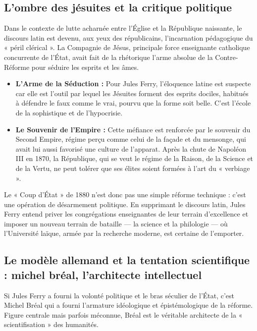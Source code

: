 \subsection{L'ombre des jésuites et la critique politique}

Dans le contexte de lutte acharnée entre l'Église et la République naissante, le discours latin est
devenu, aux yeux des républicains, l'incarnation pédagogique du « péril clérical ». La Compagnie de
Jésus, principale force enseignante catholique concurrente de l'État, avait fait de la rhétorique
l'arme absolue de la Contre-Réforme pour séduire les esprits et les âmes.

\begin{itemize}\item \textbf{L'Arme de la Séduction :} Pour Jules Ferry, l'éloquence latine est suspecte car elle est l'outil par lequel les Jésuites forment des esprits dociles, habitués à défendre le faux comme le vrai, pourvu que la forme soit belle. C'est l'école de la sophistique et de l'hypocrisie.\cite{I-1-2-ref2}\item \textbf{Le Souvenir de l'Empire :} Cette méfiance est renforcée par le souvenir du Second Empire, régime perçu comme celui de la façade et du mensonge, qui avait lui aussi favorisé une culture de l'apparat. Après la chute de Napoléon III en 1870, la République, qui se veut le régime de la Raison, de la Science et de la Vertu, ne peut tolérer que ses élites soient formées à l'art du « verbiage ».\cite{I-1-2-ref11}\end{itemize}Le « Coup d'État » de 1880 n'est donc pas une simple réforme technique : c'est une opération de
désarmement politique. En supprimant le discours latin, Jules Ferry entend priver les congrégations
enseignantes de leur terrain d'excellence et imposer un nouveau terrain de bataille — la science et
la philologie — où l'Université laïque, armée par la recherche moderne, est certaine de
l'emporter.\cite{I-1-2-ref12}



\subsection{Le modèle allemand et la tentation scientifique : michel bréal, l'architecte intellectuel}

Si Jules Ferry a fourni la volonté politique et le bras séculier de l'État, c'est Michel Bréal qui a
fourni l'armature idéologique et épistémologique de la réforme. Figure centrale mais parfois
méconnue, Bréal est le véritable architecte de la « scientifisation » des humanités.



